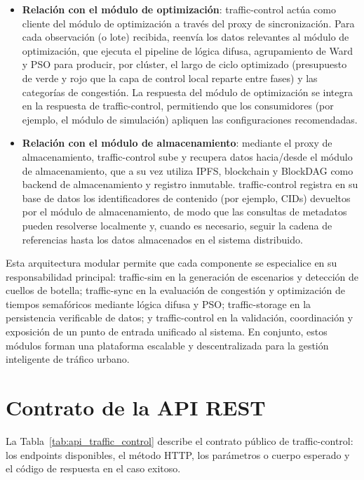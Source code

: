 \begin{itemize}
    \item \textbf{Relación con el módulo de optimización}: traffic-control actúa como cliente del módulo de optimización a través del proxy de sincronización. Para cada observación (o lote) recibida, reenvía los datos relevantes al módulo de optimización, que ejecuta el pipeline de lógica difusa, agrupamiento de Ward y PSO para producir, por clúster, el largo de ciclo optimizado (presupuesto de verde y rojo que la capa de control local reparte entre fases) y las categorías de congestión. La respuesta del módulo de optimización se integra en la respuesta de traffic-control, permitiendo que los consumidores (por ejemplo, el módulo de simulación) apliquen las configuraciones recomendadas.
    \item \textbf{Relación con el módulo de almacenamiento}: mediante el proxy de almacenamiento, traffic-control sube y recupera datos hacia/desde el módulo de almacenamiento, que a su vez utiliza IPFS, blockchain y BlockDAG como backend de almacenamiento y registro inmutable. traffic-control registra en su base de datos los identificadores de contenido (por ejemplo, CIDs) devueltos por el módulo de almacenamiento, de modo que las consultas de metadatos pueden resolverse localmente y, cuando es necesario, seguir la cadena de referencias hasta los datos almacenados en el sistema distribuido.
\end{itemize}

Esta arquitectura modular permite que cada componente se especialice en su responsabilidad principal: traffic-sim en la generación de escenarios y detección de cuellos de botella; traffic-sync en la evaluación de congestión y optimización de tiempos semafóricos mediante lógica difusa y PSO; traffic-storage en la persistencia verificable de datos; y traffic-control en la validación, coordinación y exposición de un punto de entrada unificado al sistema. En conjunto, estos módulos forman una plataforma escalable y descentralizada para la gestión inteligente de tráfico urbano.

\section{Contrato de la API REST}
\label{subsec:traffic_control_api}

La Tabla~\ref{tab:api_traffic_control} describe el contrato público de traffic-control: los endpoints disponibles, el método HTTP, los parámetros o cuerpo esperado y el código de respuesta en el caso exitoso.

